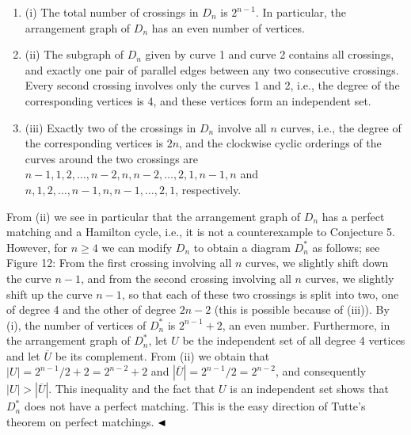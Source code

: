 \par
\begin{enumerate}
\item[]  (i) 
The total number of crossings in $D_{n}$ is $2^{n-1}$. In particular, the arrangement graph of $D_{n}$ has an even number of vertices.
\par
\par
\item[]  (ii) 
The subgraph of $D_{n}$ given by curve 1 and curve 2 contains all crossings, and exactly one pair of parallel edges between any two consecutive crossings. Every second crossing involves only the curves 1 and 2, i.e., the degree of the corresponding vertices is 4, and these vertices form an independent set.
\par
\par
\item[]  (iii) 
Exactly two of the crossings in $D_{n}$ involve all $n$ curves, i.e., the degree of the corresponding vertices is $2n$, and the clockwise cyclic orderings of the curves around the two crossings are $n-1,1,2,\ldots,n-2,n,n-2,\ldots,2,1,n-1,n$ and $n,1,2,\ldots,n-1,n,n-1,\ldots,2,1$, respectively.
\par
\par
\end{enumerate}
From (ii) we see in particular that the arrangement graph of $D_{n}$ has a perfect matching and a Hamilton cycle, i.e., it is not a counterexample to Conjecture 5. However, for $n\geq 4$ we can modify $D_{n}$ to obtain a diagram $D_{n}^{*}$ as follows; see Figure 12: From the first crossing involving all $n$ curves, we slightly shift down the curve $n-1$, and from the second crossing involving all $n$ curves, we slightly shift up the curve $n-1$, so that each of these two crossings is split into two, one of degree 4 and the other of degree $2n-2$ (this is possible because of (iii)). By (i), the number of vertices of $D_{n}^{*}$ is $2^{n-1}+2$, an even number. Furthermore, in the arrangement graph of $D_{n}^{*}$, let $U$ be the independent set of all degree 4 vertices and let $\overline{U}$ be its complement. From (ii) we obtain that $|U|=2^{n-1}/2+2=2^{n-2}+2$ and $|\overline{U}|=2^{n-1}/2=2^{n-2}$, and consequently $|U|>|\overline{U}|$. This inequality and the fact that $U$ is an independent set shows that $D_{n}^{*}$ does not have a perfect matching. This is the easy direction of Tutte’s theorem on perfect matchings. $\hfill\blacktriangleleft$
\par
\par
